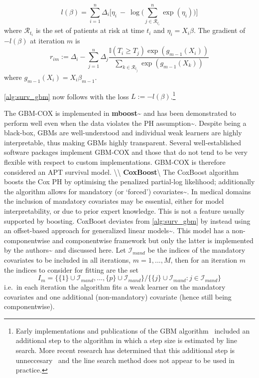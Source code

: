 \documentclass[
  letterpaper,
]{scrbook}
\theoremstyle{plain}
\theoremstyle{definition}
\theoremstyle{remark}
\begin{document}
\[
l(\beta) = \sum^n_{i=1} \Delta_i \Big[\eta_i \ - \ \log\Big(\sum^n_{j \in \mathcal{R}_{t_i}} \exp(\eta_i)\Big)\Big]
\label{eq:surv_logpartial}
\] where \(\mathcal{R}_{t_i}\) is the set of patients at risk at time
\(t_i\) and \(\eta_i = X_i\beta\). The gradient of \(-l(\beta)\) at
iteration \(m\) is \[
r_{im} := \Delta_i - \sum^n_{j=1} \Delta_j \frac{\mathbb{I}(T_i \geq T_j) \exp(g_{m-1}(X_i))}{\sum_{k \in \mathcal{R}_{t_j}} \exp(g_{m-1}(X_k))}
\label{eq:surv_partialgrad}
\] where \(g_{m-1}(X_i) = X_i\beta_{m-1}\).

\ref{alg:surv_gbm} now follows with the loss
\(L := -l(\beta)\).\footnote{Early implementations and publications of the GBM algorithm~\cite{Friedman1999, Friedman2001} included an additional step to the algorithm in which a step size is estimated by line search. More recent research has determined that this additional step is unneccesary~\cite{Buhlmann2007} and the line search method does not appear to be used in practice.}

The GBM-COX is implemented in
\textbf{mboost}\textasciitilde{}\cite{pkgmboost} and has been
demonstrated to perform well even when the data violates the PH
assumption\textasciitilde{}\cite{Johnson2011}. Despite being a
black-box, GBMs are well-understood and individual weak learners are
highly interpretable, thus making GBMs highly transparent. Several
well-established software packages implement GBM-COX and those that do
not tend to be very flexible with respect to custom implementations.
GBM-COX is therefore considered an APT survival model.
\textbackslash\textbackslash{}
\noindent \textbf{CoxBoost}\label{mod:coxboost}\textbackslash{} The
CoxBoost algorithm boosts the Cox PH by optimising the penalized
partial-log likelihood; additionally the algorithm allows for mandatory
(or `forced') covariates\textasciitilde{}\cite{Binder2008}. In medical
domains the inclusion of mandatory covariates may be essential, either
for model interpretability, or due to prior expert knowledge. This is
not a feature usually supported by boosting. CoxBoost deviates from
\ref{alg:surv_gbm} by instead using an offset-based approach for
generalized linear models\textasciitilde{}\cite{Tutz2007}. This model
has a non-componentwise and componentwise framework but only the latter
is implemented by the authors\textasciitilde{}\cite{pkgcoxboost} and
discussed here. Let \(\mathcal{I}_{mand}\) be the indices of the
mandatory covariates to be included in all iterations, \(m = 1,...,M\),
then for an iteration \(m\) the indices to consider for fitting are the
set \[
 I_m = \{\{1\} \cup \mathcal{I}_{mand},...,\{p\} \cup \mathcal{I}_{mand}\} / \{\{j\} \cup \mathcal{I}_{mand} : j \in \mathcal{I}_{mand}\}
\] i.e.~in each iteration the algorithm fits a weak learner on the
mandatory covariates and one additional (non-mandatory) covariate (hence
still being componentwise).
\end{document}
